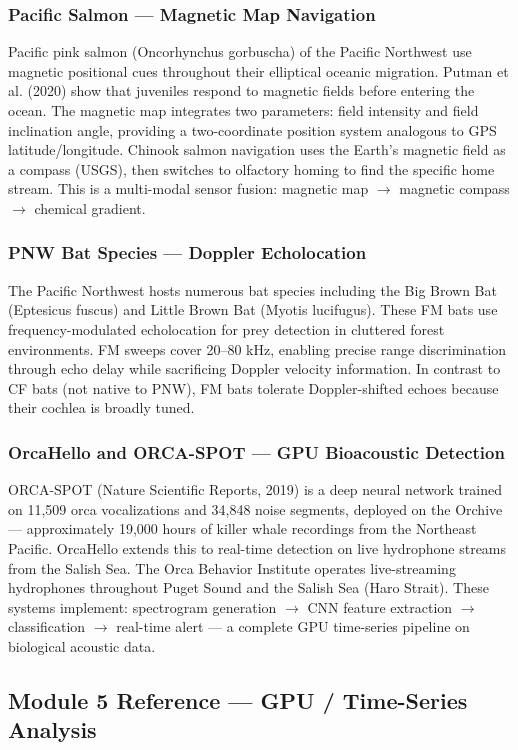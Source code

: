 \documentclass[11pt,letterpaper]{article}
\begin{document}
\subsubsection{Pacific Salmon --- Magnetic Map Navigation}
Pacific pink salmon (Oncorhynchus gorbuscha) of the Pacific Northwest use magnetic positional cues throughout their elliptical oceanic migration. Putman et al. (2020) show that juveniles respond to magnetic fields before entering the ocean. The magnetic map integrates two parameters: field intensity and field inclination angle, providing a two-coordinate position system analogous to GPS latitude/longitude. Chinook salmon navigation uses the Earth's magnetic field as a compass (USGS), then switches to olfactory homing to find the specific home stream. This is a multi-modal sensor fusion: magnetic map $\to$ magnetic compass $\to$ chemical gradient.

\subsubsection{PNW Bat Species --- Doppler Echolocation}
The Pacific Northwest hosts numerous bat species including the Big Brown Bat (Eptesicus fuscus) and Little Brown Bat (Myotis lucifugus). These FM bats use frequency-modulated echolocation for prey detection in cluttered forest environments. FM sweeps cover 20--80 kHz, enabling precise range discrimination through echo delay while sacrificing Doppler velocity information. In contrast to CF bats (not native to PNW), FM bats tolerate Doppler-shifted echoes because their cochlea is broadly tuned.

\subsubsection{OrcaHello and ORCA-SPOT --- GPU Bioacoustic Detection}
ORCA-SPOT (Nature Scientific Reports, 2019) is a deep neural network trained on 11,509 orca vocalizations and 34,848 noise segments, deployed on the Orchive --- approximately 19,000 hours of killer whale recordings from the Northeast Pacific. OrcaHello extends this to real-time detection on live hydrophone streams from the Salish Sea. The Orca Behavior Institute operates live-streaming hydrophones throughout Puget Sound and the Salish Sea (Haro Strait). These systems implement: spectrogram generation $\to$ CNN feature extraction $\to$ classification $\to$ real-time alert --- a complete GPU time-series pipeline on biological acoustic data.

\subsection{Module 5 Reference --- GPU / Time-Series Analysis}
\end{document}
